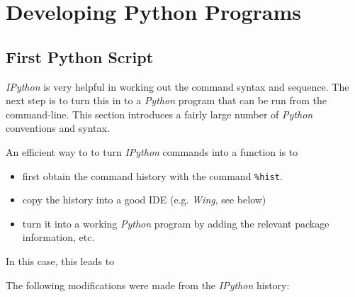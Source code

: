 \section{Developing Python Programs}

\subsection{First Python Script}

\emph{IPython} is very helpful in working out the command syntax and sequence. The next step is to turn this in to a \emph{Python} program that can be run from the command-line. This section introduces a fairly large number of \emph{Python} conventions and syntax.

An efficient way to to turn \emph{IPython} commands into a function is to

\begin{itemize}
  \item first obtain the command history with the command \lstinline{%hist}.
  \item copy the history into a good IDE (e.g. \emph{Wing}, see below)
  \item turn it into a working \emph{Python} program by adding the relevant package information, etc.
\end{itemize}

In this case, this leads to



The following modifications were made from the \emph{IPython} history:

